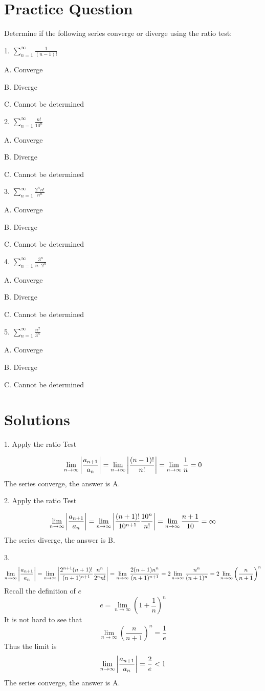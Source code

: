 \documentclass{article}
\numberwithin{equation}{section}
\begin{document}
\section{Practice Question}
Determine if the following series converge or diverge using the ratio test:

1. $\displaystyle \sum_{n=1}^{\infty} \frac{1}{(n-1)!}$

A. Converge

B. Diverge 

C. Cannot be determined 

2. $\displaystyle \sum_{n=1}^{\infty} \frac{n!}{10^n}$

A. Converge

B. Diverge 

C. Cannot be determined 

3. $\displaystyle \sum_{n=1}^{\infty} \frac{2^n n!}{n^n}$

A. Converge

B. Diverge 

C. Cannot be determined 

4. $\displaystyle \sum_{n=1}^{\infty} \frac{3^n}{n\cdot 2^n}$

A. Converge

B. Diverge 

C. Cannot be determined 

5. $\displaystyle \sum_{n=1}^{\infty} \frac{n^2}{3^n}$

A. Converge

B. Diverge 

C. Cannot be determined 

\section{Solutions}
1. Apply the ratio Test

\[
\lim_{n\to \infty} \abs{\frac{a_{n+1}}{a_n}} = \lim_{n\to \infty} \abs{\frac{(n-1)!}{n!}} = \lim_{n\to \infty} \frac{1}{n} = 0
\]
The series converge, the answer is A.

2. Apply the ratio Test

\[
\lim_{n\to \infty} \abs{\frac{a_{n+1}}{a_n}} = \lim_{n\to \infty} \abs{\frac{(n+1)!}{10^{n+1}} \frac{10^n}{n!}} = \lim_{n\to \infty} \frac{n+1}{10} = \infty
\]
The series diverge, the answer is B.

3. 
\[
\lim_{n\to \infty} \abs{\frac{a_{n+1}}{a_n}} = \lim_{n\to \infty} \abs{\frac{2^{n+1} (n+1)!}{(n+1)^{n+1}} \frac{n^n}{2^n n!}} = \lim_{n\to \infty} \frac{2(n+1)n^n}{(n+1)^{n+1}} = 2\lim_{n\to\infty} \frac{n^n}{(n+1)^n} = 2\lim_{n\to\infty}\left(\frac{n}{n+1}\right)^n
\]
Recall the definition of $e$
\[
e = \lim_{n\to\infty} \left(1+\frac{1}{n}\right)^n
\]
It is not hard to see that 
\[
\lim_{n\to\infty}\left(\frac{n}{n+1}\right)^n = \frac{1}{e}
\]
Thus the limit is 
\[
\lim_{n\to \infty} \abs{\frac{a_{n+1}}{a_n}} = \frac{2}{e} < 1
\]
The series converge, the answer is A.
\end{document}
